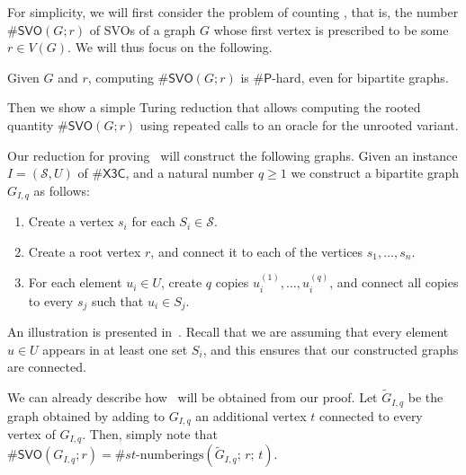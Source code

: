 \documentclass[11pt]{amsart}
\newcommand{\ns}{s}
\begin{document}
For simplicity, we will first consider the problem of counting , that is, the number $\#\mathsf{SVO}(G; r)$ of SVOs of a graph $G$ whose first vertex is prescribed to be some $r \in V(G)$. We will thus focus on the following.

\begin{thm}\label{thm:main2}
    Given $G$ and $r$, computing
    $\#\mathsf{SVO}(G; r)$ is $\#\mathsf{P}$-hard, even for bipartite graphs.
\end{thm}

Then we show a simple Turing reduction that allows computing the rooted quantity $\#\mathsf{SVO}(G; r)$ using repeated calls to an oracle for the unrooted variant.

Our reduction for proving~ will construct the following graphs. Given an instance $I = (\mathcal{S}, U)$ of $\#\mathsf{X3C}$, and a natural number $q \geq 1$ we construct a bipartite graph $G_{I, q}$ as follows:
\begin{enumerate}
    \item Create a vertex $\ns_i$ for each $S_i \in \mathcal{S}$.
    \item Create a root vertex $r$, and connect it to each of the vertices $\ns_1, \dots, \ns_n$.
    \item For each element $u_i \in U$, create $q$ copies $u_i^{(1)}, \dots, u_i^{(q)}$, and connect all copies to every $\ns_j$ such that $u_i \in S_j$.
\end{enumerate} 

An illustration is presented in~. Recall that we are assuming that every element $u \in U$ appears in at least one set $S_i$, and this ensures that our constructed graphs are connected. 

We can already describe how~ will be obtained from our proof. Let $\widetilde{G}_{I, q}$ be the graph obtained by adding to $G_{I, q}$ an additional vertex $t$ connected to every vertex of $G_{I, q}$. Then, simply note that $\#\mathsf{SVO}(G_{I, q}; r) = \#st\text{-numberings}(\widetilde{G}_{I, q};\, r;\, t)$.
\end{document}
